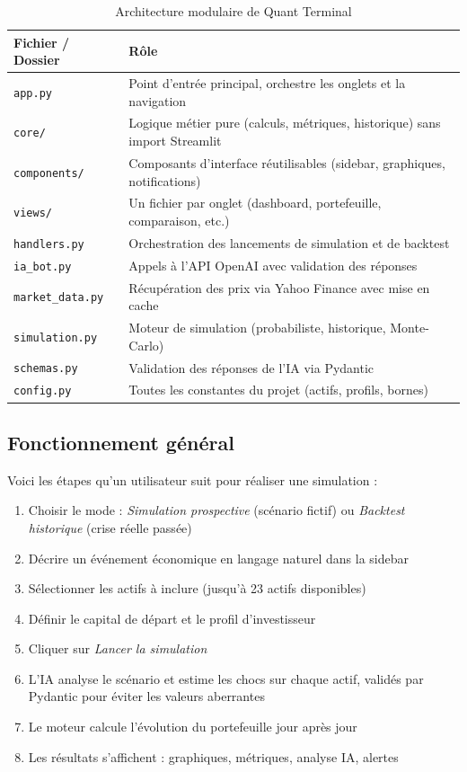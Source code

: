 \documentclass[a4paper, 12pt, twoside]{article}
\begin{document}
\begin{table}[h]
\begin{center}
\begin{tabular}{|l|p{9cm}|}
\hline
\textbf{Fichier / Dossier} & \textbf{Rôle} \\
\hline
\texttt{app.py} & Point d'entrée principal, orchestre les onglets et la navigation \\
\hline
\texttt{core/} & Logique métier pure (calculs, métriques, historique) sans import Streamlit \\
\hline
\texttt{components/} & Composants d'interface réutilisables (sidebar, graphiques, notifications) \\
\hline
\texttt{views/} & Un fichier par onglet (dashboard, portefeuille, comparaison, etc.) \\
\hline
\texttt{handlers.py} & Orchestration des lancements de simulation et de backtest \\
\hline
\texttt{ia\_bot.py} & Appels à l'API OpenAI avec validation des réponses \\
\hline
\texttt{market\_data.py} & Récupération des prix via Yahoo Finance avec mise en cache \\
\hline
\texttt{simulation.py} & Moteur de simulation (probabiliste, historique, Monte-Carlo) \\
\hline
\texttt{schemas.py} & Validation des réponses de l'IA via Pydantic \\
\hline
\texttt{config.py} & Toutes les constantes du projet (actifs, profils, bornes) \\
\hline
\end{tabular}
\end{center}
\caption{Architecture modulaire de Quant Terminal}
\end{table}

\subsection{Fonctionnement général}

Voici les étapes qu'un utilisateur suit pour réaliser une simulation :

\begin{enumerate}
    \item Choisir le mode : \textit{Simulation prospective} (scénario fictif) ou
    \textit{Backtest historique} (crise réelle passée)
    \item Décrire un événement économique en langage naturel dans la sidebar
    \item Sélectionner les actifs à inclure (jusqu'à 23 actifs disponibles)
    \item Définir le capital de départ et le profil d'investisseur
    \item Cliquer sur \textit{Lancer la simulation}
    \item L'IA analyse le scénario et estime les chocs sur chaque actif,
    validés par Pydantic pour éviter les valeurs aberrantes
    \item Le moteur calcule l'évolution du portefeuille jour après jour
    \item Les résultats s'affichent : graphiques, métriques, analyse IA, alertes
\end{enumerate}
\end{document}
